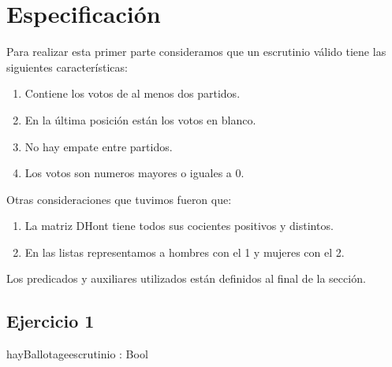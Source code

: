 \documentclass[10pt,a4paper]{article}
\begin{document}
\maketitle

\section{Especificación}

\noindent Para realizar esta primer parte consideramos que un escrutinio válido tiene las siguientes características:
\begin{enumerate} \setlength\itemsep{0cm}
	\item Contiene los votos de al menos dos partidos.
	\item En la última posición están los votos en blanco.
	\item No hay empate entre partidos.
	\item Los votos son numeros mayores o iguales a 0.
\end{enumerate}
Otras consideraciones que tuvimos fueron que:
\begin{enumerate} \setlength\itemsep{0cm}
	\item La matriz DHont tiene todos sus cocientes positivos y distintos.
	\item En las listas representamos a hombres con el 1 y mujeres con el 2.
\end{enumerate}
Los predicados y auxiliares utilizados están definidos al final de la sección. \\

\subsection{Ejercicio 1}

\begin{proc}{hayBallotage}{\In escrutinio : \TLista{\ent}}{Bool}
\end{proc}
\end{document}
